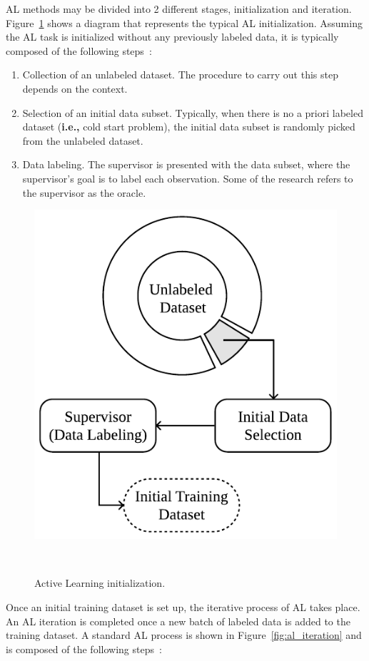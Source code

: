 \documentclass[parskip=full]{scrartcl}
\begin{document}
AL methods may be divided into 2 different stages, initialization and
iteration. Figure~\ref{fig:al_initialization} shows a diagram that represents
the typical AL initialization. Assuming the AL task is initialized without any
previously labeled data, it is typically composed of the following
steps~\cite{Fonseca2021}:

\begin{enumerate}

    \item Collection of an unlabeled dataset. The procedure to carry out
        this step depends on the context.

    \item Selection of an initial data subset. Typically, when there is no a
        priori labeled dataset (\textbf{i.e.,} cold start problem), the
        initial data subset is randomly picked from the unlabeled dataset.

    \item Data labeling. The supervisor is presented with the data
        subset, where the supervisor's goal is to label each observation. Some
        of the research refers to the supervisor as the oracle.

\end{enumerate}

\begin{figure}[H]
	\centering
	\includegraphics[width=.4\linewidth]{../analysis/al_initialization}
    \caption{%
        Active Learning initialization.
    }~\label{fig:al_initialization}
\end{figure}

Once an initial training dataset is set up, the iterative process of AL takes
place. An AL iteration is completed once a new batch of labeled data is added
to the training dataset. A standard AL process is shown in
Figure~\ref{fig:al_iteration} and is composed of the following
steps~\cite{Su2020, Sverchkov2017}:
\end{document}
